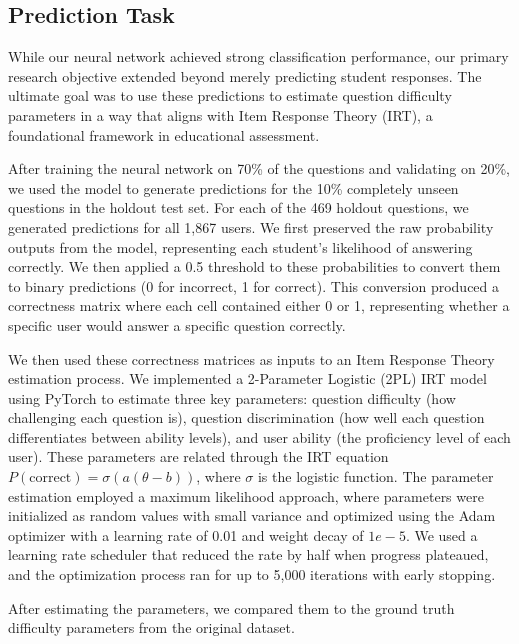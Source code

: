 \documentclass[
    a4paper, %
    10pt, %
    twoside, %
]{LTJournalArticle}
\begin{document}
\subsection{Prediction Task}

While our neural network achieved strong classification performance, our primary research objective extended beyond merely predicting student responses. The ultimate goal was to use these predictions to estimate question difficulty parameters in a way that aligns with Item Response Theory (IRT), a foundational framework in educational assessment.

After training the neural network on 70\% of the questions and validating on 20\%, we used the model to generate predictions for the 10\% completely unseen questions in the holdout test set. For each of the 469 holdout questions, we generated predictions for all 1,867 users. We first preserved the raw probability outputs from the model, representing each student's likelihood of answering correctly. We then applied a 0.5 threshold to these probabilities to convert them to binary predictions (0 for incorrect, 1 for correct). This conversion produced a correctness matrix where each cell contained either 0 or 1, representing whether a specific user would answer a specific question correctly.

We then used these correctness matrices as inputs to an Item Response Theory estimation process. We implemented a 2-Parameter Logistic (2PL) IRT model using PyTorch to estimate three key parameters: question difficulty (how challenging each question is), question discrimination (how well each question differentiates between ability levels), and user ability (the proficiency level of each user). These parameters are related through the IRT equation $P(\text{correct}) = \sigma(a(\theta - b))$, where $\sigma$ is the logistic function. The parameter estimation employed a maximum likelihood approach, where parameters were initialized as random values with small variance and optimized using the Adam optimizer with a learning rate of 0.01 and weight decay of $1e-5$. We used a learning rate scheduler that reduced the rate by half when progress plateaued, and the optimization process ran for up to 5,000 iterations with early stopping.

After estimating the parameters, we compared them to the ground truth difficulty parameters from the original dataset. 


\end{document}
